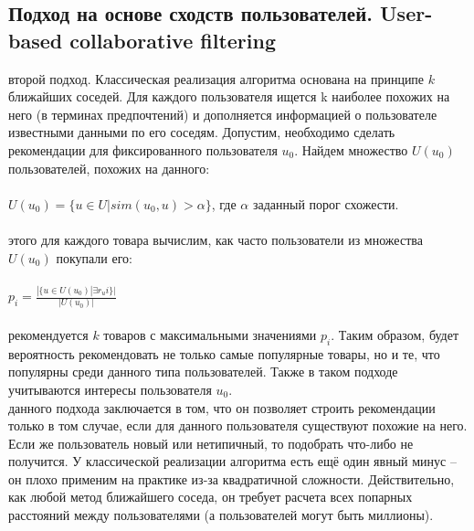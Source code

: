 \documentclass{article}
\newcommand\tab[1][1cm]{\hspace*{#1}}
\begin{document}
\subsection{Подход на основе сходств пользователей. User-based collaborative filtering}
 второй подход. Классическая реализация алгоритма основана на принципе $k$ ближайших соседей. Для каждого пользователя ищется k наиболее похожих на него (в терминах предпочтений) и дополняется информацией о пользователе известными данными по его соседям. Допустим, необходимо сделать рекомендации для фиксированного пользователя $u_0$. Найдем множество ﻿$U(u_0)$ пользователей, похожих на данного:\\
\\
\tab$U(u_0)=\{u\in U|sim(u_0,u)>\alpha\}$, где ﻿$\alpha$ заданный порог схожести.\\
\\
 этого для каждого товара вычислим, как часто пользователи из множества $U(u_0)$ покупали его:\\
\\
\tab$p_i=\frac{|\{u\in U(u_0)|\exists r_ui\}|}{|U(u_0)|}$\\
\\
 рекомендуется ﻿$k$ товаров с максимальными значениями ﻿$p_i$. Таким образом, будет вероятность рекомендовать не только самые популярные товары, но и те, что популярны среди данного типа пользователей. Также в таком подходе учитываются интересы пользователя $u_0$﻿.\\
 данного подхода заключается в том, что он позволяет строить рекомендации только в том случае, если для данного пользователя существуют похожие на него. Если же пользователь новый или нетипичный, то подобрать что-либо не получится. У классической реализации алгоритма есть ещё один явный минус – он плохо применим на практике из-за квадратичной сложности. Действительно, как любой метод ближайшего соседа, он требует расчета всех попарных расстояний между пользователями (а пользователей могут быть миллионы).
\end{document}
